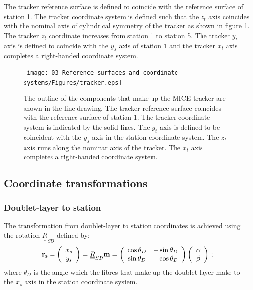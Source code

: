The tracker reference surface is defined to coincide with the
reference surface of station 1.
The tracker coordinate system is defined such that the $z_t$ axis
coincides with the nominal axis of cylindrical symmetry of the tracker
as shown in figure \ref{Fig:TrkRef&Coord}.
The tracker $z_t$ coordinate increases from station 1 to station 5.
The tracker $y_t$ axis is defined to coincide with the $y_s$ axis of
station 1 and the tracker $x_t$ axis completes a right-handed coordinate
system.
\begin{figure}
  \begin{center}
    \texttt{[image: 03-Reference-surfaces-and-coordinate-systems/Figures/tracker.eps]}
  \end{center}
  \caption{
    The outline of the components that make up the MICE tracker are
    shown in the line drawing.
    The tracker reference surface coincides with the reference surface
    of station 1.
    The tracker coordinate system is indicated by the solid lines.
    The $y_t$ axis is defined to be coincident with the $y_s$ axis in the
    station coordinate system.  
    The $z_t$ axis runs along the nominar axis of the tracker.
    The $x_t$ axis completes a right-handed coordinate system.
  }
  \label{Fig:TrkRef&Coord}
\end{figure}

\subsection{Coordinate transformations}
\label{SubSect:CoordTran}

\subsubsection{Doublet-layer to station}
\label{SubSubSect:DblStn}

The transformation from doublet-layer to station coordinates is
achieved using the rotation $\underline{\underline{R}}_{SD}$ defined
by: 
\begin{equation}
  {\bf r_s} = 
    \left(
        \begin{array}{c}
           x_s                                                      \\
           y_s
        \end{array}
    \right) = \underline{\underline{R}}_{SD} {\bf m} =
    \left(
        \begin{array}{cc}
           \cos \theta_D & -\sin \theta_D                           \\
           \sin \theta_D & -\cos \theta_D
        \end{array}
    \right) 
    \left(
        \begin{array}{c}
           \alpha                                                   \\
           \beta
        \end{array}
    \right) \, ;
\end{equation}
where $\theta_D$ is the angle which the fibres that make up the
doublet-layer make to the $x_s$ axis in the station coordinate
system.
